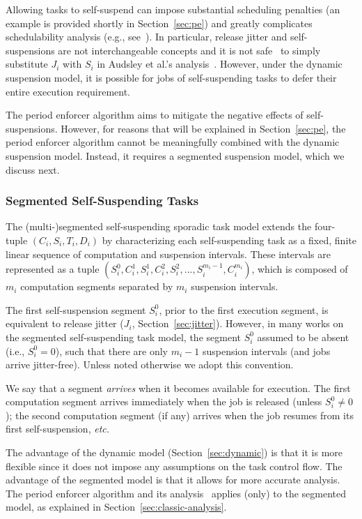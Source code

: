 Allowing tasks to self-suspend can impose substantial scheduling penalties (an example is provided shortly in Section~\ref{sec:pe}) and greatly complicates  schedulability analysis (e.g., see~\cite{ecrts15nelissen,Ri:04,Chen2016}). In particular, release jitter and self-suspensions are not interchangeable concepts and it is not safe~\cite{Chen2016,ecrts15nelissen} to simply substitute $J_i$ with $S_i$ in Audsley et al.'s analysis~\cite{ABRTW:93}. However, under the dynamic suspension model, it is possible for jobs of self-suspending tasks to defer their entire execution requirement.

The period enforcer algorithm aims to mitigate the negative effects of self-suspensions. However, for reasons that will be explained in Section~\ref{sec:pe}, the period enforcer algorithm cannot be meaningfully combined with the dynamic suspension model. Instead, it requires a segmented suspension model, which we discuss next.


\subsubsection{Segmented Self-Suspending Tasks}
\label{sec:segmented}

The (multi-)segmented self-suspending sporadic task model extends the  four-tuple $(C_i,S_i,T_i,D_i)$ by characterizing each self-suspending task as a fixed, finite linear sequence of computation and suspension intervals. These intervals are represented as a tuple
$(S_{i}^0,C_{i}^1,S_{i}^1,C_{i}^2,S_{i}^2,...,S_{i}^{m_i-1},C_{i}^{m_i})$, which is composed of $m_i$ computation segments separated by $m_i$ suspension intervals.

The first self-suspension segment $S_i^0$, prior to the first execution segment, is equivalent to release jitter ($J_i$, Section~\ref{sec:jitter}). However, in many works on the segmented self-suspending task model, the segment $S_i^0$ assumed to be absent (i.e., $S_i^0 = 0$), such that there are only $m_i - 1$ suspension intervals (and jobs arrive jitter-free). Unless noted otherwise we adopt this convention.

We say that a segment \emph{arrives} when it becomes available for execution. The first computation segment arrives immediately when the job is released (unless $S_i^0 \neq 0$); the second computation segment (if any) arrives when the job resumes from its first self-suspension, \textit{etc.}


The advantage of the dynamic model (Section~\ref{sec:dynamic}) is that it is more flexible since it does not impose any assumptions on the task control flow. The advantage of the segmented model is that it allows for more accurate analysis. The period enforcer algorithm and its analysis~\cite{Raj:suspension1991} applies (only) to the segmented model, as explained in Section~\ref{sec:classic-analysis}. 

